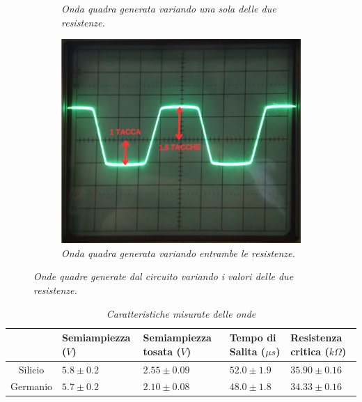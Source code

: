 \begin{figure}[H]
\begin{subfigure}{0.3\textwidth}
        \caption{\emph{Onda quadra generata variando una sola delle due resistenze.}}
        \label{fig : resistenze diverse 1}
      \end{subfigure}
      \hfill
      \begin{subfigure}{0.3\textwidth}
        \centering
        \includegraphics[width=\textwidth]{../assets/Resistenze_Diverse2.png}
        \caption{\emph{Onda quadra generata variando entrambe le resistenze.}}
        \label{fig : resistenze diverse 2}
      \end{subfigure}
      \caption{\emph{Onde quadre generate dal circuito variando i valori delle due resistenze.}}
    \label{fig:dati-raccolti}
  \end{figure}
\begin{table}[H]
  \centering
  \begin{tabular}[t]{c | p{3cm}  p{3cm}  p{3cm}  p{3cm}}
    \hline
    & Semiampiezza ($V$) & Semiampiezza tosata ($V$) & Tempo di Salita ($\mu s$) & Resistenza critica ($k \Omega$) \\
    \hline
    Silicio & $5.8 \pm 0.2$ & $2.55 \pm 0.09$ & $52.0 \pm 1.9$ & $35.90 \pm 0.16$ \\
    Germanio & $5.7 \pm 0.2$ & $2.10 \pm 0.08$ & $48.0 \pm 1.8$ & $34.33 \pm 0.16$ \\
    \hline
  \end{tabular}
  \caption{\emph{Caratteristiche misurate delle onde}}
  \label{tab:risultati}
\end{table}

